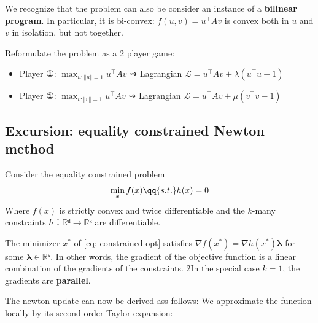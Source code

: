 \documentclass[10pt]{article}
\begin{document}
We recognize that the problem can also be consider an instance of a \textbf{bilinear program}. In particular, it is bi-convex: $f(u,v) = u^⊤ A v$ is convex both in $u$ and $v$ in isolation, but not together.




Reformulate the problem as a 2 player game:

\begin{itemize}%
	\item Player ①: $\max_{u: ‖u‖=1} u^⊤Av$  ⇝ Lagrangian $ℒ = u^⊤Av + λ(u^⊤ u - 1)$
	\item Player ①: $\max_{v: ‖v‖=1} u^⊤Av$  ⇝ Lagrangian $ℒ = u^⊤Av + μ(v^⊤ v - 1)$
\end{itemize}%


\subsection{Excursion: equality constrained Newton method}

Consider the equality constrained problem
%
\begin{align}\label{eq: constrained opt}%
\min_x f(x) \qq{s.t.} h(x)=0%
\end{align}%
%
Where $f(x)$ is strictly convex and twice differentiable and the $k$-many constraints $h：ℝᵈ→ℝᵏ$ are differentiable.

\begin{theorem}\label{thm: min constrained op}%
The minimizer $x^*$ of \eqref{eq: constrained opt} satisfies $∇f(x^*)  = ∇h(x^*)𝛌$ for some $𝛌∈ℝᵏ$. In other words, the gradient of the objective function is a linear combination of the gradients of the constraints. 2In the special case $k=1$, the gradients are \textbf{parallel}.
\end{theorem}%
%
The newton update can now be derived ass follows: We approximate the function locally by its second order Taylor expansion:
\end{document}
